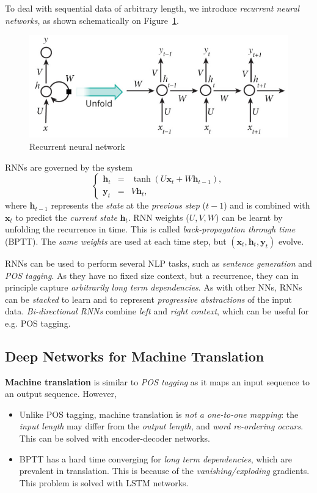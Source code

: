 To deal with sequential data of arbitrary length, we introduce \emph{recurrent neural networks}, as shown schematically on Figure~\ref{fig:rnn}.
\begin{figure}[!hbtp]
	\centering
	\includegraphics[width=\textwidth]{img/rnn}
	\caption{Recurrent neural network}
	\label{fig:rnn}
\end{figure}
RNNs are governed by the system
\[
\left\{\begin{array}{rcl}
\bm{h}_t & = & \tanh(U\bm{x}_t + W\bm{h}_{t-1}),\\
\bm{y}_t & = & V \bm{h}_t,
\end{array}\right.
\]
where \(\bm{h}_{t-1}\) represents the \emph{state} at the \emph{previous step} (\(t-1\)) and is combined with \(\bm{x}_t\) to predict the \emph{current state} \(\bm{h}_t\).
RNN weights (\(U, V, W\)) can be learnt by unfolding the recurrence in time.
This is called \emph{back-propagation through time} (BPTT).
The \emph{same weights} are used at each time step, but \((\bm{x}_t, \bm{h}_t, \bm{y}_t)\) evolve.

RNNs can be used to perform several NLP tasks, such as \emph{sentence generation} and \emph{POS tagging}.
As they have no fixed size context, but a recurrence, they can in principle capture \emph{arbitrarily long term dependencies}.
As with other NNs, RNNs can be \emph{stacked} to learn and to represent \emph{progressive abstractions} of the input data.
\emph{Bi-directional RNNs} combine \emph{left} and \emph{right context}, which can be useful for e.g. POS tagging.

\subsection{Deep Networks for Machine Translation}
\textbf{Machine translation} is similar to \emph{POS tagging} as it maps an input sequence to an output sequence.
However,
\begin{itemize}
	\item Unlike POS tagging, machine translation is \emph{not a one-to-one mapping}: the \emph{input length} may differ from the \emph{output length}, and \emph{word re-ordering occurs}.
	This can be solved with encoder-decoder networks.
	\item BPTT has a hard time converging for \emph{long term dependencies}, which are prevalent in translation.
	This is because of the \emph{vanishing/exploding} gradients.
	This problem is solved with LSTM networks.
\end{itemize}

